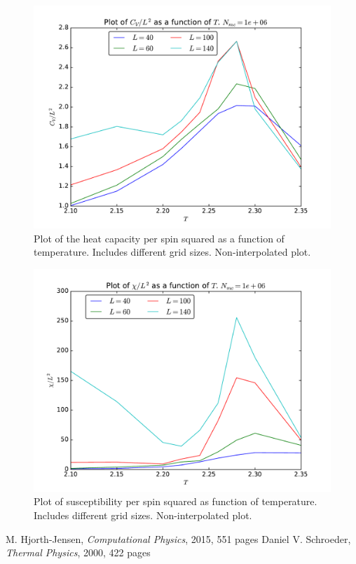 \documentclass[12pt]{article}
\begin{document}
\begin{figure}[H]
\centering
\includegraphics[width=\linewidth]{Plots/Heat_capacity_parallellization.pdf}
\caption{Plot of the heat capacity per spin squared as a function of temperature. Includes different grid sizes. Non-interpolated plot.}
\label{fig:parallell_heat_capacity}
\end{figure}

\begin{figure}[H]
\centering
\includegraphics[width=\linewidth]{Plots/Susceptibility_parallellization.pdf}
\caption{Plot of susceptibility per spin squared as function of temperature. Includes different grid sizes. Non-interpolated plot.}
\label{fig:parallell_susceptiblity}
\end{figure}

\FloatBarrier
\begin{thebibliography}{1}
     M. Hjorth-Jensen, \emph{Computational Physics}, 2015, 551 pages
     Daniel V. Schroeder, \emph{Thermal Physics}, 2000, 422 pages
\end{thebibliography}
\end{document}
